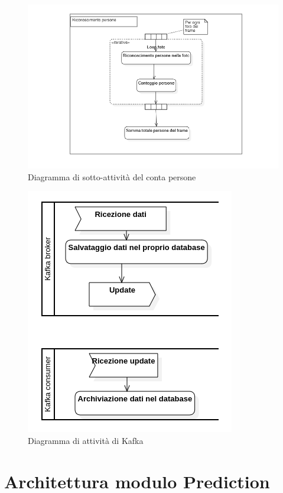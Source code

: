 \begin{figure}[H]
  \begin{center}
    \includegraphics[scale=0.7]{../immagini/diag_PB/conta_persone.png}
    \caption{Diagramma di sotto-attività del conta persone}
  \end{center}
\end{figure}
\begin{figure}[H]
  \begin{center}
    \includegraphics[scale=0.8]{../immagini/diag_PB/kafka.png}
    \caption{Diagramma di attività di Kafka}
  \end{center}
\end{figure}


\section{Architettura modulo Prediction}
